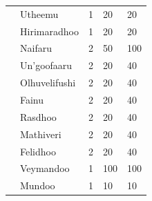 \begin{table}[H]
{\begin{tabular}{lllll}
                                                                  & Utheemu                                                          & 1                 & 20              & 20                   \\
                                                                  & Hirimaradhoo                                                     & 1                 & 20              & 20                   \\
                                                                  & Naifaru                                                          & 2                 & 50              & 100                  \\
                                                                  & Un'goofaaru                                                      & 2                 & 20              & 40                   \\
                                                                  & Olhuvelifushi                                                    & 2                 & 20              & 40                   \\
                                                                  & Fainu                                                            & 2                 & 20              & 40                   \\
                                                                  & Rasdhoo                                                          & 2                 & 20              & 40                   \\
                                                                  & Mathiveri                                                        & 2                 & 20              & 40                   \\
                                                                  & Felidhoo                                                         & 2                 & 20              & 40                   \\
                                                                  & Veymandoo                                                        & 1                 & 100             & 100                  \\
                                                                  & Mundoo                                                           & 1                 & 10              & 10                   \\

\end{tabular}}
\end{table}
